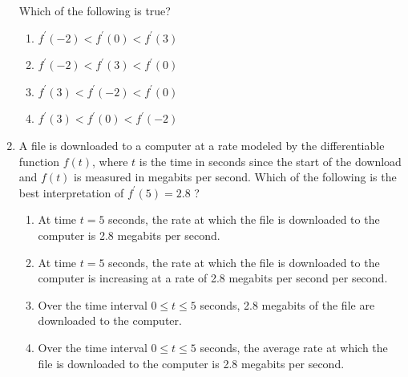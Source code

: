 \documentclass{article}
\begin{document}
\begin{enumerate}
\begin{minipage}[t]{\linewidth}
Which of the following is true?
\vspace{1em}
		\begin{enumerate}
		\itemsep1em
			\item \(f^{\prime}(-2)<f^{\prime}(0)<f^{\prime}(3)\)
			\item \(f^{\prime}(-2)<f^{\prime}(3)<f^{\prime}(0)\)
			\item \(f^{\prime}(3)<f^{\prime}(-2)<f^{\prime}(0)\)
			\item \(f^{\prime}(3)<f^{\prime}(0)<f^{\prime}(-2)\)
		\end{enumerate}
	\end{minipage}
	\item
	\begin{minipage}[t]{\linewidth}
		A file is downloaded to a computer at a rate modeled by the
differentiable function \(f(t)\), where \(t\) is the time in seconds
since the start of the download and \(f(t)\) is measured in megabits per
second. Which of the following is the best interpretation of
\(f^{\prime}(5)=2.8\) ?
\vspace{1em}
		\begin{enumerate}
		\itemsep1em
			\item At time \(t=5\) seconds, the rate at which the file is downloaded to the
computer is 2.8 megabits per second.
			\item At time \(t=5\) seconds, the rate at which the file is downloaded to the
computer is increasing at a rate of 2.8 megabits per second per second.
			\item Over the time interval \(0 \leq t \leq 5\) seconds, 2.8 megabits of the
file are downloaded to the computer.
			\item Over the time interval \(0 \leq t \leq 5\) seconds, the average rate at
which the file is downloaded to the computer is 2.8 megabits per second.
		\end{enumerate}
	\end{minipage}
\end{enumerate}
\end{document}
